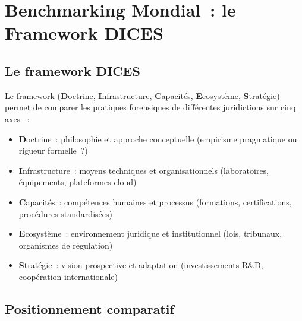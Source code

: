 \section{Benchmarking Mondial~: le Framework DICES}
\label{sec:dices}

\subsection{Le framework DICES}

Le framework  (\textbf{D}octrine,
\textbf{I}nfrastructure, \textbf{C}apacités, \textbf{E}cosystème,
\textbf{S}tratégie) permet de comparer les pratiques forensiques de
différentes juridictions sur cinq axes \cite{dfrws2001}~:
\begin{itemize}
    \item \textbf{D}octrine~: philosophie et approche conceptuelle
          (empirisme pragmatique ou rigueur formelle~?)
    \item \textbf{I}nfrastructure~: moyens techniques et organisationnels
          (laboratoires, équipements, plateformes cloud)
    \item \textbf{C}apacités~: compétences humaines et processus
          (formations, certifications, procédures standardisées)
    \item \textbf{E}cosystème~: environnement juridique et institutionnel
          (lois, tribunaux, organismes de régulation)
    \item \textbf{S}tratégie~: vision prospective et adaptation
          (investissements R\&D, coopération internationale)
\end{itemize}

\subsection{Positionnement comparatif}

